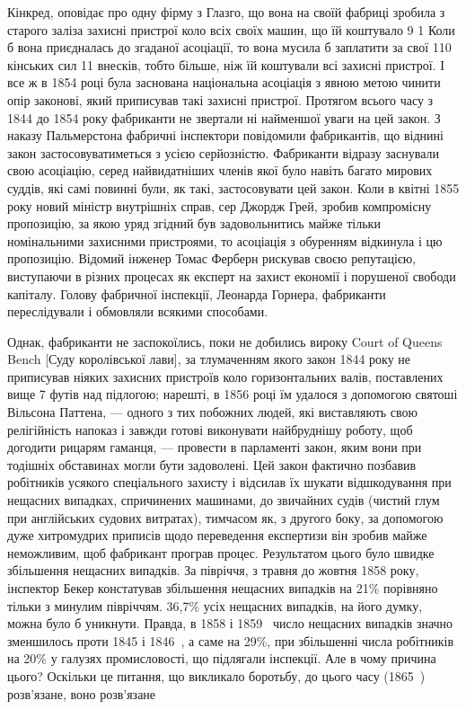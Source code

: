 \parcont{}  %
Кінкред, оповідає про одну фірму з Глазго, що вона на своїй
фабриці зробила з старого заліза захисні пристрої коло всіх
своїх машин, що їй коштувало 9 1
Коли б вона приєдналась до згаданої асоціації, то вона мусила б
заплатити за свої 110 кінських сил 11 внесків,
тобто більше, ніж їй коштували всі захисні пристрої. І все ж
в 1854 році була заснована національна асоціація з явною метою
чинити опір законові, який приписував такі захисні пристрої.
Протягом всього часу з 1844 до 1854 року фабриканти не звертали
ні найменшої уваги на цей закон. З наказу Пальмерстона
фабричні інспектори повідомили фабрикантів, що віднині закон
застосовуватиметься з усією серйозністю. Фабриканти відразу
заснували свою асоціацію, серед найвидатніших членів якої було
навіть багато мирових суддів, які самі повинні були, як такі, застосовувати цей закон. Коли в квітні
1855 року новий міністр
внутрішніх справ, сер Джордж Грей, зробив компромісну пропозицію, за якою уряд згідний був
задовольнитись майже тільки
номінальними захисними пристроями, то асоціація з обуренням
відкинула і цю пропозицію. Відомий інженер Томас Ферберн
рискував своєю репутацією, виступаючи в різних процесах як
експерт на захист економії і порушеної свободи капіталу. Голову
фабричної інспекції, Леонарда Горнера, фабриканти переслідували і обмовляли всякими способами.

Однак, фабриканти не заспокоїлись, поки не добились вироку
Court of Queens Bench [Суду королівської лави], за тлумаченням
якого закон 1844 року не приписував ніяких захисних пристроїв коло горизонтальних валів, поставлених
вище 7 футів над
підлогою; нарешті, в 1856 році їм удалося з допомогою святоші
Вільсона Паттена, — одного з тих побожних людей, які виставляють
свою релігійність напоказ і завжди готові виконувати найбруднішу
роботу, щоб догодити рицарям гаманця, — провести в парламенті
закон, яким вони при тодішніх обставинах могли бути задоволені.
Цей закон фактично позбавив робітників усякого спеціального захисту і відсилав їх шукати
відшкодування при нещасних випадках,
спричинених машинами, до звичайних судів (чистий глум при
англійських судових витратах), тимчасом як, з другого боку,
за допомогою дуже хитромудрих приписів щодо переведення
експертизи він зробив майже неможливим, щоб фабрикант програв процес. Результатом цього було швидке
збільшення нещасних випадків. За півріччя, з травня до жовтня 1858 року,
інспектор Бекер констатував збільшення нещасних випадків на
21\% порівняно тільки з минулим півріччям. 36,7\% усіх нещасних
випадків, на його думку, можна було б уникнути. Правда,
в 1858 і 1859~ число нещасних випадків значно зменшилось
проти 1845 і 1846~, а саме на 29\%, при збільшенні числа робітників на 20\% у галузях
промисловості, що підлягали інспекції.
Але в чому причина цього? Оскільки це питання, що викликало
боротьбу, до цього часу (1865~) розв’язане, воно розв’язане
\parbreak{}  %
